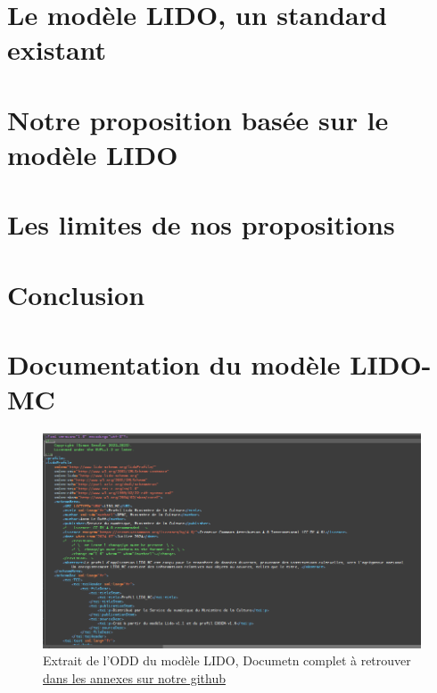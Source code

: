 \documentclass[a4paper,12pt,twoside]{book}
\begin{document}
 \chapter{Le modèle LIDO, un standard existant}
 
 
 \chapter{Notre proposition basée sur le modèle LIDO}
 
 
 \chapter{Les limites de nos propositions}
 
	
	
	\chapter*{Conclusion}
 
        
\newpage{\pagestyle{empty}\cleardoublepage}
	







\appendix %

\chapter[Documentation du modèle LIDO-MC]{Documentation du modèle LIDO-MC}
\begin{figure}[h!]
	\centerline{\includegraphics[width=\textwidth]{medias/extrait_ODD.png}}
	\caption{Extrait de l'ODD du modèle LIDO, Documetn complet à retrouver \href{https://github.com/annaleduff/Memoire_tnah_Anna_Le_Duff/tree/main/Annexes}{dans les annexes sur notre github}}
\end{figure}



\newpage{\pagestyle{empty}\cleardoublepage}


\backmatter %


\printglossaries[title=Glossaire, style=long]
\tableofcontents
\end{document}
